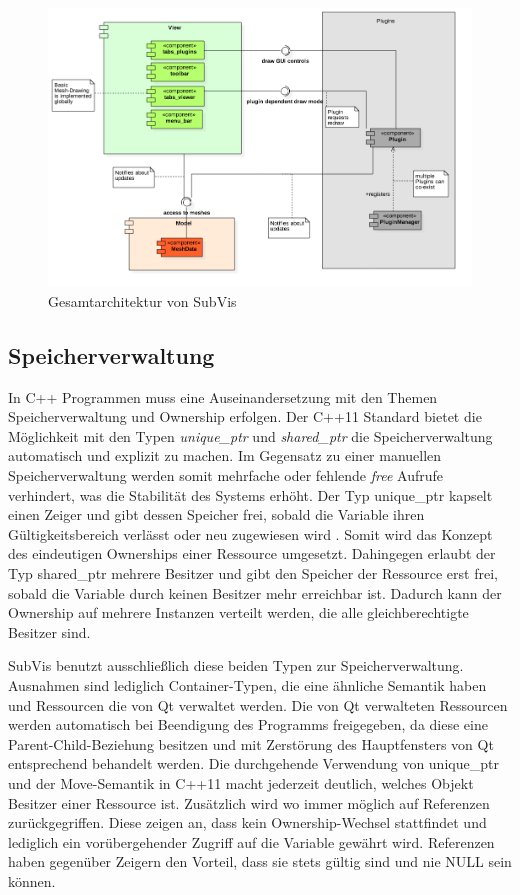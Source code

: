 \begin{figure}
  \centering
  \includegraphics[width=\textwidth]{content/media/subvis_architektur.png}
  \caption{Gesamtarchitektur von SubVis}
  \label{fig:subvis_architektur}
\end{figure}


\subsection{Speicherverwaltung}

In C++ Programmen muss eine Auseinandersetzung mit den Themen Speicherverwaltung und Ownership erfolgen.
Der C++11 Standard bietet die Möglichkeit mit den Typen \emph{unique\_ptr} und \emph{shared\_ptr} die Speicherverwaltung automatisch und explizit zu machen.
Im Gegensatz zu einer manuellen Speicherverwaltung werden somit mehrfache oder fehlende \emph{free} Aufrufe verhindert, was die Stabilität des Systems erhöht.
Der Typ unique\_ptr kapselt einen Zeiger und gibt dessen Speicher frei, sobald die Variable ihren Gültigkeitsbereich verlässt oder neu zugewiesen wird \cite{C++Ref}. 
Somit wird das Konzept des eindeutigen Ownerships einer Ressource umgesetzt.
Dahingegen erlaubt der Typ shared\_ptr mehrere Besitzer und gibt den Speicher der Ressource erst frei, sobald die Variable durch keinen Besitzer mehr erreichbar ist.
Dadurch kann der Ownership auf mehrere Instanzen verteilt werden, die alle gleichberechtigte Besitzer sind.

SubVis benutzt ausschließlich diese beiden Typen zur Speicherverwaltung.
Ausnahmen sind lediglich Container-Typen, die eine ähnliche Semantik haben und Ressourcen die von Qt verwaltet werden.
Die von Qt verwalteten Ressourcen werden automatisch bei Beendigung des Programms freigegeben, da diese eine Parent-Child-Beziehung besitzen und mit Zerstörung des Hauptfensters von Qt entsprechend behandelt werden.
Die durchgehende Verwendung von unique\_ptr und der Move-Semantik in C++11 macht jederzeit deutlich, welches Objekt Besitzer einer Ressource ist.
Zusätzlich wird wo immer möglich auf Referenzen zurückgegriffen.
Diese zeigen an, dass kein Ownership-Wechsel stattfindet und lediglich ein vorübergehender Zugriff auf die Variable gewährt wird.
Referenzen haben gegenüber Zeigern den Vorteil, dass sie stets gültig sind und nie NULL sein können.

